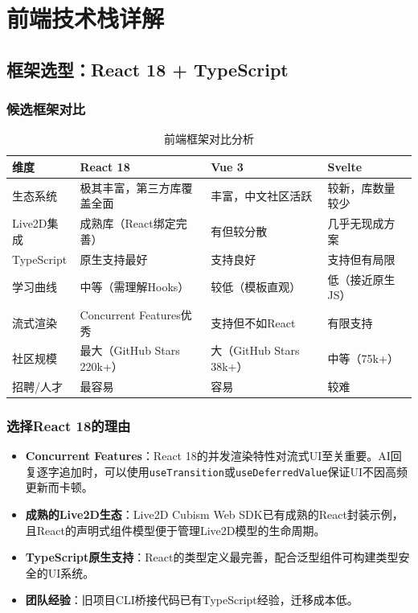 \documentclass[fontset=mac,a4paper,11pt]{ctexart}
\begin{document}
\section{前端技术栈详解}

\subsection{框架选型：React 18 + TypeScript}

\subsubsection{候选框架对比}

\begin{table}[H]
\centering
\caption{前端框架对比分析}
\label{tab:frontend-framework}
\begin{tabular}{L{2.5cm}L{3.5cm}L{3.5cm}L{3.5cm}}
\toprule
\textbf{维度} & \textbf{React 18} & \textbf{Vue 3} & \textbf{Svelte} \\
\midrule
{}
生态系统 & 极其丰富，第三方库覆盖全面 & 丰富，中文社区活跃 & 较新，库数量较少 \\
Live2D集成 & 成熟库（React绑定完善） & 有但较分散 & 几乎无现成方案 \\
TypeScript & 原生支持最好 & 支持良好 & 支持但有局限 \\
学习曲线 & 中等（需理解Hooks） & 较低（模板直观） & 低（接近原生JS） \\
流式渲染 & Concurrent Features优秀 & 支持但不如React & 有限支持 \\
社区规模 & 最大（GitHub Stars 220k+） & 大（GitHub Stars 38k+） & 中等（75k+） \\
招聘/人才 & 最容易 & 容易 & 较难 \\
\bottomrule
\end{tabular}
\end{table}

\subsubsection{选择React 18的理由}

\begin{itemize}[leftmargin=2em]
\item \textbf{Concurrent Features}：React 18的并发渲染特性对流式UI至关重要。AI回复逐字追加时，可以使用\texttt{useTransition}或\texttt{useDeferredValue}保证UI不因高频更新而卡顿。
\item \textbf{成熟的Live2D生态}：Live2D Cubism Web SDK已有成熟的React封装示例，且React的声明式组件模型便于管理Live2D模型的生命周期。
\item \textbf{TypeScript原生支持}：React的类型定义最完善，配合泛型组件可构建类型安全的UI系统。
\item \textbf{团队经验}：旧项目CLI桥接代码已有TypeScript经验，迁移成本低。
\end{itemize}
\end{document}
